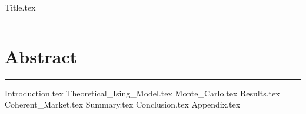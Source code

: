 \documentclass[11pt]{article}
\newcommand{\HRule}[1]{\rule{\linewidth}{#1}}
\begin{document}
{Title.tex}

\HRule{0.3pt} 

\section*{Abstract}

\HRule{0.3pt} 

\tableofcontents


{Introduction.tex}
{Theoretical_Ising_Model.tex}
{Monte_Carlo.tex}
{Results.tex}
{Coherent_Market.tex}
{Summary.tex}
{Conclusion.tex}
{Appendix.tex}



\end{document}
